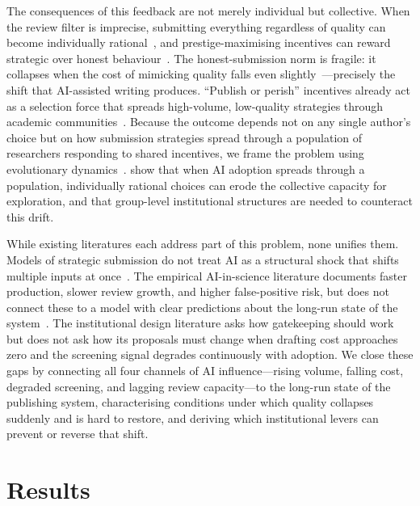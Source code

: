 \documentclass{article}
\begin{document}
The consequences of this feedback are not merely individual but collective.
When the review filter is imprecise, submitting everything regardless of quality can become individually rational~\citep{Thurner2011}, and prestige-maximising incentives can reward strategic over honest behaviour~\citep{Zollman2024}.
The honest-submission norm is fragile: it collapses when the cost of mimicking quality falls even slightly~\citep{Tiokhin2021}---precisely the shift that AI-assisted writing produces.
``Publish or perish'' incentives already act as a selection force that spreads high-volume, low-quality strategies through academic communities~\citep{Smaldino2016, Ioannidis2005}.
Because the outcome depends not on any single author's choice but on how submission strategies spread through a population of researchers responding to shared incentives, we frame the problem using evolutionary dynamics~\citep{Weibull1995, Hofbauer1998}.
\citet{ZhongEisenmannGarciaRahwan2026} show that when AI adoption spreads through a population, individually rational choices can erode the collective capacity for exploration, and that group-level institutional structures are needed to counteract this drift.

While existing literatures each address part of this problem, none unifies them.
Models of strategic submission do not treat AI as a structural shock that shifts multiple inputs at once~\citep{Thurner2011, Zollman2024, Tiokhin2021}.
The empirical AI-in-science literature documents faster production, slower review growth, and higher false-positive risk, but does not connect these to a model with clear predictions about the long-run state of the system~\citep{NoyZhang2023, Liang2025, Latona2024}.
The institutional design literature asks how gatekeeping should work~\citep{Ellison2002, MullerItten2022, Cotton2013} but does not ask how its proposals must change when drafting cost approaches zero and the screening signal degrades continuously with adoption.
We close these gaps by connecting all four channels of AI influence---rising volume, falling cost, degraded screening, and lagging review capacity---to the long-run state of the publishing system, characterising conditions under which quality collapses suddenly and is hard to restore, and deriving which institutional levers can prevent or reverse that shift.

\section{Results}
\label{sec:results}
\end{document}
